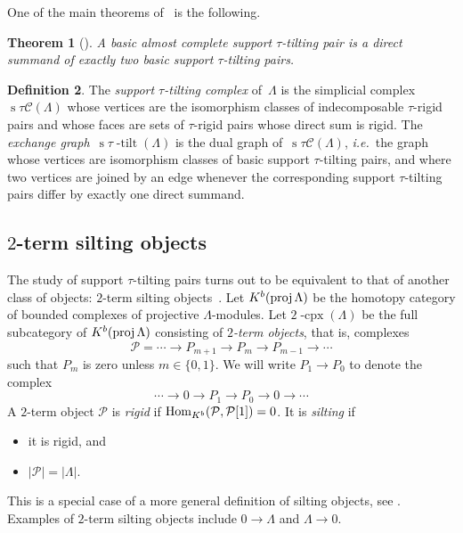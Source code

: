 \documentclass{compositio}
\newtheorem{theorem}{Theorem}%
\theoremstyle{definition}
\newtheorem{definition}[theorem]{Definition}
\newcommand{\ie}{\textit{i.e.}~} %
\newcommand{\darkblue}{\color{darkblue}} %
\newcommand{\defn}[1]{\textsl{\darkblue #1}} %
\newcommand{\complexP}{\mathcal{P}} %
\newcommand{\stau}{\operatorname{s} \! \tau \! \operatorname{-tilt}}
\newcommand{\cpx}{2 \! \operatorname{-cpx}}
\newcommand{\tiltingComplex}{\operatorname{s} \! \tau\mathcal{C}}
\newcommand{\proj}{\operatorname{{\rm proj }}}
\newcommand{\Hom}[1]{\operatorname{{\rm Hom}}_{#1}}
\begin{document}
One of the main theorems of~\cite{AdachiIyamaReiten} is the following.

\begin{theorem}[{\cite[Thm.~0.4]{AdachiIyamaReiten}}]
 A basic almost complete support $\tau$-tilting pair is a direct summand of exactly two basic support $\tau$-tilting pairs.
\end{theorem}

\begin{definition}
The \defn{support $\tau$-tilting complex} of~$\Lambda$ is the simplicial complex~$\tiltingComplex(\Lambda)$ whose vertices are the isomorphism classes of indecomposable $\tau$-rigid pairs and whose faces are sets of $\tau$-rigid pairs whose direct sum is rigid.
The \defn{exchange graph}~$\stau(\Lambda)$ is the dual graph of~$\tiltingComplex(\Lambda)$, \ie the graph whose vertices are isomorphism classes of basic support $\tau$-tilting pairs, and where two vertices are joined by an edge whenever the corresponding support $\tau$-tilting pairs differ by exactly one direct summand.
\end{definition}


\subsection{$2$-term silting objects}

The study of support $\tau$-tilting pairs turns out to be equivalent to that of another class of objects: $2$-term silting objects~\cite[Sect.~3]{AdachiIyamaReiten}.
Let $K^b(\proj \Lambda)$ be the homotopy category of bounded complexes of projective $\Lambda$-modules. 
Let $\cpx(\Lambda)$ be the full subcategory of $K^b(\proj \Lambda)$ consisting of \defn{$2$-term objects}, that is, complexes
\[
  \complexP = \cdots \to P_{m+1} \to P_m \to P_{m-1} \to \cdots
\]
such that $P_m$ is zero unless $m\in \{0,1\}$.  
We will write $P_1\to P_0$ to denote the complex
\[
\cdots \to 0 \to P_1 \to P_0 \to 0 \to \cdots
\]
A $2$-term object $\complexP$ is \defn{rigid} if $\Hom{K^b}(\complexP, \complexP[1]) = 0$.  It is \defn{silting} if
\begin{itemize}
 \item it is rigid, and 
 \item $|\complexP| = |\Lambda|$.
\end{itemize}
This is a special case of a more general definition of silting objects, see \cite{KellerVossieck}.
Examples of $2$-term silting objects include $0\to \Lambda$ and $\Lambda \to 0$.
\end{document}
